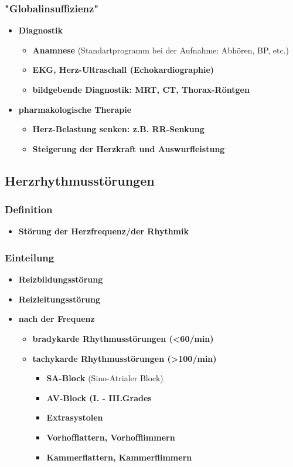 		\subsubsection{"Globalinsuffizienz"}
			\begin{itemize}	
				\item \textbf{Diagnostik}
					\begin{itemize}
						\item \textbf{Anamnese} (Standartprogramm bei der Aufnahme: Abhören, BP, etc.)
						\item \textbf{EKG, Herz-Ultraschall (Echokardiographie)}
						\item \textbf{bildgebende Diagnostik: MRT, CT, Thorax-Röntgen}
					\end{itemize}
				\item \textbf{pharmakologische Therapie}
					\begin{itemize}
						\item \textbf{Herz-Belastung senken: z.B. RR-Senkung}
						\item \textbf{Steigerung der Herzkraft und Auswurfleistung}
					\end{itemize}
			\end{itemize}
	\subsection{Herzrhythmusstörungen}
		\subsubsection{Definition}
			\begin{itemize}
				\item \textbf{Störung der Herzfrequenz/der Rhythmik}
			\end{itemize}
		\subsubsection{Einteilung}
			\begin{itemize}
				\item \textbf{Reizbildungsstörung}
				\item \textbf{Reizleitungsstörung}
				\item \textbf{nach der Frequenz}
					\begin{itemize}
						\item \textbf{bradykarde Rhythmusstörungen (<60/min)}
						\item \textbf{tachykarde Rhythmusstörungen (>100/min)}
							\begin{itemize}
								\item \textbf{SA-Block} (Sino-Atrialer Block)
								\item \textbf{AV-Block (I. - III.Grades}
								\item \textbf{Extrasystolen}
								\item \textbf{Vorhofflattern, Vorhofflimmern}
								\item \textbf{Kammerflattern, Kammerflimmern}								
							\end{itemize}
					\end{itemize}
			\end{itemize}
